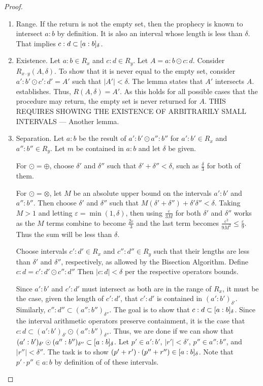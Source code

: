 \begin{proof}
    

\begin{enumerate}
    \item Range. If the return is not the empty set, then the prophecy is known to intersect $a:b$ by definition. It is also an interval whose length is less than $\delta$. That implies $c:d \subset [a:b]_{\delta}$. 
    \item Existence. Let $a:b \in R_x$ and $c:d \in R_y$. Let $A = a:b \odot c:d$. Consider $R_{x\cdot y}(A, \delta)$. To show that it is never equal to the empty set, consider $a':b' \odot c':d' = A'$ such that $|A'| < \delta$. The lemma states that $A'$ intersects $A$. establishes. Thus, $R(A, \delta) = A'$. As this holds for all possible cases that the procedure may return, the empty set is never returned for $A$. THIS REQUIRES SHOWING THE EXISTENCE OF ARBITRARILY SMALL INTERVALS --- Another lemma. 
    \item Separation. Let $a:b$ be the result of $a':b' \odot a'':b''$ for $a':b' \in R_x$ and $a'': b'' \in R_y$. Let $m$ be contained in $a:b$ and let $\delta$ be given. 
    
    
    For $\odot = \oplus$, choose $\delta'$ and $\delta''$ such that $\delta' + \delta'' < \delta$, such as $\frac{\delta}{3}$ for both of them. 
    
    For $\odot = \otimes$, let $M$ be an absolute upper bound on the intervals $a':b'$ and $a'':b''$. Then choose $\delta'$ and $\delta''$ such that $M (\delta' + \delta'') + \delta' \delta'' < \delta$. Taking $M> 1$ and letting $\varepsilon = \min(1, \delta)$, then using $\frac{\varepsilon}{3M}$ for both $\delta'$ and $\delta''$ works as the $M$ terms combine to become $\frac{2 \varepsilon}{3}$ and the last term becomes $\frac{\varepsilon^2}{9M^2} \leq \frac{\varepsilon}{9}$. Thus the sum will be less than $\delta$.
    
    Choose intervals $c':d' \in R_x$ and $c'':d'' \in R_y$  such that their lengths are less than $\delta'$ and $\delta''$, respectively, as allowed by the Bisection Algorithm. Define $c:d = c':d' \odot c'':d''$ Then $|c:d| < \delta$ per the respective operators bounds. 
    
    Since $a':b'$ and $c':d'$ must intersect as both are in the range of $R_x$, it must be the case, given the length of $c':d'$, that $c':d'$ is contained in $(a':b')_{\delta'}$. Similarly, $c'':d'' \subset (a'':b'')_{\delta''}$. The goal is to show that $c:d \subset [a:b]_{\delta}$. Since the interval arithmetic operators preserve containment, it is the case that $c:d \subset (a':b')_{\delta'} \odot (a'':b'')_{\delta''}$. Thus, we are done if we can show that  $(a':b')_{\delta'} \odot (a'':b'')_{\delta''} \subset [a:b]_{\delta}$. Let $p' \in a':b'$, $|r'| < \delta'$, $p'' \in a'':b''$, and $|r''| < \delta''$.  The task is to show $(p'+r') \cdot (p''+ r'') \in [a:b]_{\delta}$. Note that $p' \cdot p'' \in a:b$ by definition of of these intervals. 


\end{enumerate}
\end{proof}

